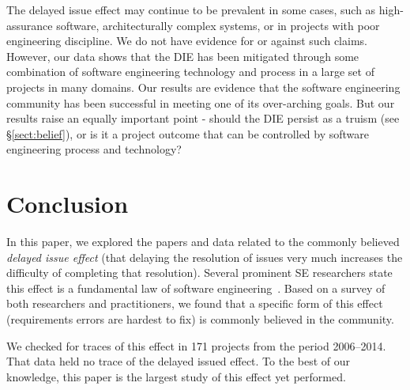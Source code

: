 \documentclass[smallcondensed]{svjour3}
\begin{document}
The delayed issue effect may continue to be prevalent in some cases, such as high-assurance software, architecturally complex systems, or in projects with poor engineering discipline. We do not have evidence for or against such claims. However, our data shows that the DIE has been mitigated through some combination of software engineering technology and process in a large set of projects in many domains. Our results are evidence that the software engineering community has been successful in meeting one of its over-arching goals. But our results raise an equally important point - should the DIE persist as a truism (see \S\ref{sect:belief}), or is it a project outcome that can be controlled by software engineering process and technology?
 
 
 \section{Conclusion}
 \label{sect:conclusion}
 
In this paper, we explored   the papers and data related to the 
commonly believed {\em delayed issue effect} (that delaying the resolution of issues
very much 
increases the difficulty of completing that  resolution).
Several prominent SE researchers state this effect is a fundamental law of software engineering~\cite{mcconnell01,boehm01,glass02}.
Based on a  survey  of both researchers and practitioners, we  found that
a specific form  of this effect (requirements errors are hardest to fix) is  commonly believed in the community.  

We checked for traces of this effect in 171 projects from the period 2006--2014.
That data held no trace of the delayed issued effect.
To the best of our knowledge, this paper is the  largest study
of this effect yet performed.

 
\end{document}
